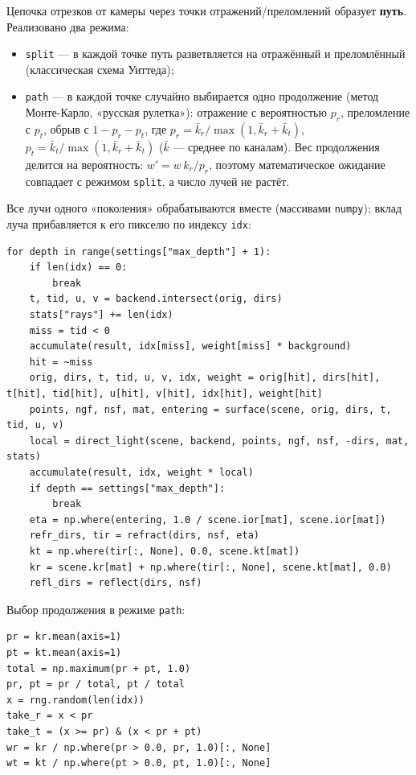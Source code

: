 \documentclass[12pt,a4paper]{article}
\begin{document}
Цепочка отрезков от камеры через точки отражений/преломлений образует \textbf{путь}. Реализовано два режима:

\begin{itemize}
\item \texttt{split} — в каждой точке путь разветвляется на отражённый и преломлённый (классическая схема Уиттеда);
\item \texttt{path} — в каждой точке случайно выбирается одно продолжение (метод Монте-Карло, «русская рулетка»):
      отражение с вероятностью $p_r$, преломление с $p_t$, обрыв с $1-p_r-p_t$, где
      $p_r = \bar k_r / \max(1, \bar k_r + \bar k_t)$, $p_t = \bar k_t / \max(1, \bar k_r + \bar k_t)$
      ($\bar k$ — среднее по каналам). Вес продолжения делится на вероятность: $w' = w\,k_r/p_r$, поэтому
      математическое ожидание совпадает с режимом \texttt{split}, а число лучей не растёт.
\end{itemize}

Все лучи одного «поколения» обрабатываются вместе (массивами \texttt{numpy}); вклад луча прибавляется к его
пикселю по индексу \texttt{idx}:

\begin{lstlisting}
for depth in range(settings["max_depth"] + 1):
    if len(idx) == 0:
        break
    t, tid, u, v = backend.intersect(orig, dirs)
    stats["rays"] += len(idx)
    miss = tid < 0
    accumulate(result, idx[miss], weight[miss] * background)
    hit = ~miss
    orig, dirs, t, tid, u, v, idx, weight = orig[hit], dirs[hit], t[hit], tid[hit], u[hit], v[hit], idx[hit], weight[hit]
    points, ngf, nsf, mat, entering = surface(scene, orig, dirs, t, tid, u, v)
    local = direct_light(scene, backend, points, ngf, nsf, -dirs, mat, stats)
    accumulate(result, idx, weight * local)
    if depth == settings["max_depth"]:
        break
    eta = np.where(entering, 1.0 / scene.ior[mat], scene.ior[mat])
    refr_dirs, tir = refract(dirs, nsf, eta)
    kt = np.where(tir[:, None], 0.0, scene.kt[mat])
    kr = scene.kr[mat] + np.where(tir[:, None], scene.kt[mat], 0.0)
    refl_dirs = reflect(dirs, nsf)
\end{lstlisting}

Выбор продолжения в режиме \texttt{path}:

\begin{lstlisting}
pr = kr.mean(axis=1)
pt = kt.mean(axis=1)
total = np.maximum(pr + pt, 1.0)
pr, pt = pr / total, pt / total
x = rng.random(len(idx))
take_r = x < pr
take_t = (x >= pr) & (x < pr + pt)
wr = kr / np.where(pr > 0.0, pr, 1.0)[:, None]
wt = kt / np.where(pt > 0.0, pt, 1.0)[:, None]
\end{lstlisting}
\end{document}
